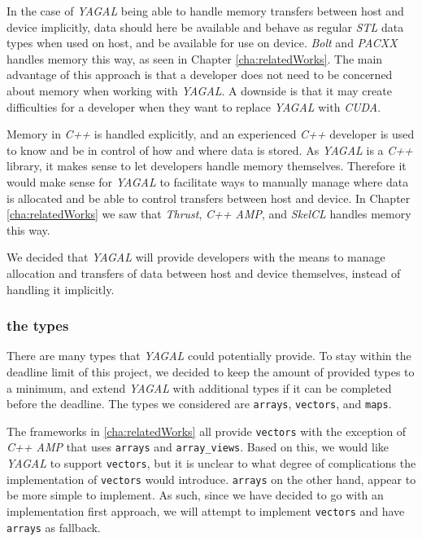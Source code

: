 In the case of \textit{YAGAL} being able to handle memory transfers between host and device implicitly, data should here be available and behave as regular \textit{STL} data types when used on host, and be available for use on device. \textit{Bolt} and \textit{PACXX} handles memory this way, as seen in Chapter \ref{cha:relatedWorks}. The main advantage of this approach is that a developer does not need to be concerned about memory when working with \textit{YAGAL}. A downside is that it may create difficulties for a developer when they want to replace \textit{YAGAL} with \textit{CUDA}.

Memory in \textit{C++} is handled explicitly, and an experienced \textit{C++} developer is used to know and be in control of how and where data is stored. As \textit{YAGAL} is a \textit{C++} library, it makes sense to let developers handle memory themselves. Therefore it would make sense for \textit{YAGAL} to facilitate ways to manually manage where data is allocated and be able to control transfers between host and device. In Chapter \ref{cha:relatedWorks} we saw that \textit{Thrust}, \textit{C++ AMP}, and \textit{SkelCL} handles memory this way.

We decided that \textit{YAGAL} will provide developers with the means to manage allocation and transfers of data between host and device themselves, instead of handling it implicitly.

\subsubsection{the types}
There are many types that \textit{YAGAL} could potentially provide. To stay within the deadline limit of this project, we decided to keep the amount of provided types to a minimum, and extend \textit{YAGAL} with additional types if it can be completed before the deadline. The types we considered are \texttt{arrays}, \texttt{vectors}, and \texttt{maps}.

The frameworks in \ref{cha:relatedWorks} all provide \texttt{vectors} with the exception of \textit{C++ AMP} that uses \texttt{arrays} and \texttt{array\_views}. Based on this, we would like \textit{YAGAL} to support \texttt{vectors}, but it is unclear to what degree of complications the implementation of \texttt{vectors} would introduce. \texttt{arrays} on the other hand, appear to be more simple to implement. As such, since we have decided to go with an implementation first approach, we will attempt to implement \texttt{vectors} and have \texttt{arrays} as fallback.

